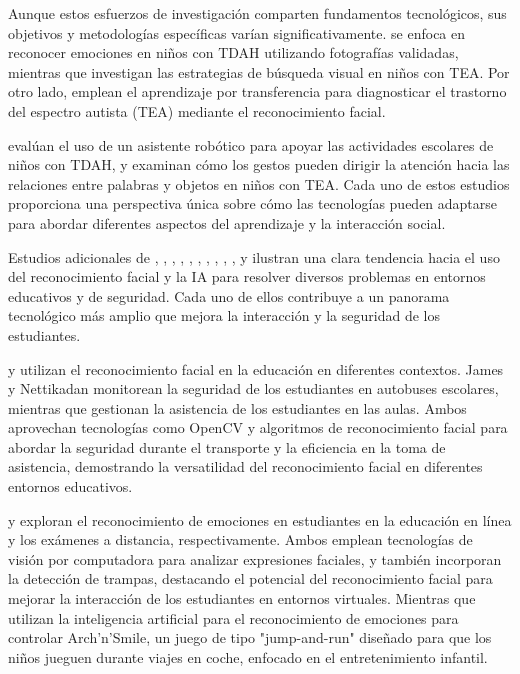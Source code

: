 \documentclass[a4paper,fleqn]{cas-sc}
\begin{document}
	Aunque estos esfuerzos de investigación comparten fundamentos tecnológicos, sus objetivos y metodologías específicas varían significativamente. \cite{Pelc2006} se enfoca en reconocer emociones en niños con TDAH utilizando fotografías validadas, mientras que \cite{Albrecht2014} investigan las estrategias de búsqueda visual en niños con TEA. Por otro lado, \cite{Akter2021} emplean el aprendizaje por transferencia para diagnosticar el trastorno del espectro autista (TEA) mediante el reconocimiento facial.
	
	\cite{Berrezueta-Guzman2021} evalúan el uso de un asistente robótico para apoyar las actividades escolares de niños con TDAH, y \cite{VilliersRader2021} examinan cómo los gestos pueden dirigir la atención hacia las relaciones entre palabras y objetos en niños con TEA. Cada uno de estos estudios proporciona una perspectiva única sobre cómo las tecnologías pueden adaptarse para abordar diferentes aspectos del aprendizaje y la interacción social.
	
	Estudios adicionales de \cite{James2019}, \cite{Hachad2020}, \cite{Enadula2021}, \cite{Ozdamli2022}, \cite{Kulkarni2023}, \cite{Narkhede2023}, \cite{Farsani2020}, \cite{Boumiza2017}, \cite{Muller2018ArchnSmile}, \cite{DaCosta2023}, y \cite{Kumar2024Zoom} ilustran una clara tendencia hacia el uso del reconocimiento facial y la IA para resolver diversos problemas en entornos educativos y de seguridad. Cada uno de ellos contribuye a un panorama tecnológico más amplio que mejora la interacción y la seguridad de los estudiantes.
	
	\cite{James2019} y \cite{Hachad2020} utilizan el reconocimiento facial en la educación en diferentes contextos. James y Nettikadan \cite{James2019} monitorean la seguridad de los estudiantes en autobuses escolares, mientras que \cite{Hachad2020} gestionan la asistencia de los estudiantes en las aulas. Ambos aprovechan tecnologías como OpenCV y algoritmos de reconocimiento facial para abordar la seguridad durante el transporte y la eficiencia en la toma de asistencia, demostrando la versatilidad del reconocimiento facial en diferentes entornos educativos.
	
	\cite{Enadula2021} y \cite{Ozdamli2022} exploran el reconocimiento de emociones en estudiantes en la educación en línea y los exámenes a distancia, respectivamente. Ambos emplean tecnologías de visión por computadora para analizar expresiones faciales, y \cite{Ozdamli2022} también incorporan la detección de trampas, destacando el potencial del reconocimiento facial para mejorar la interacción de los estudiantes en entornos virtuales. Mientras que \cite{Muller2018ArchnSmile} utilizan la inteligencia artificial para el reconocimiento de emociones para controlar Arch'n'Smile, un juego de tipo "jump-and-run" diseñado para que los niños jueguen durante viajes en coche, enfocado en el entretenimiento infantil.
	
\end{document}
